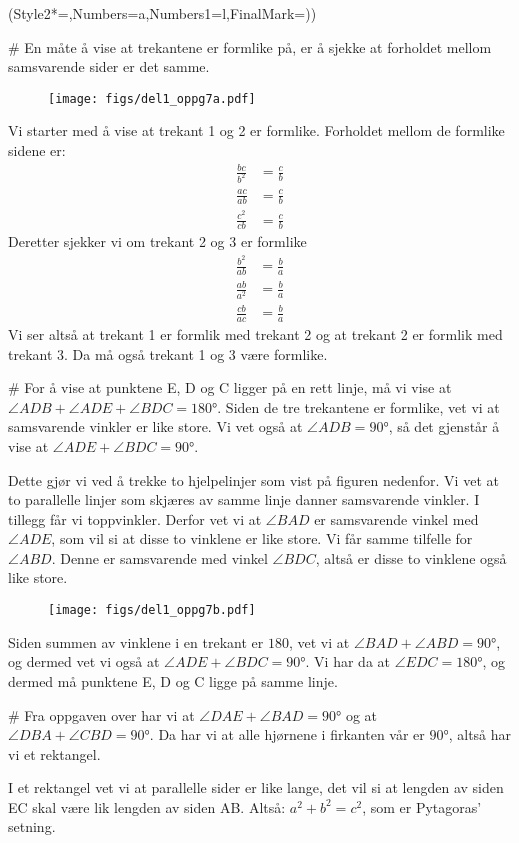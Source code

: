 \begin{easylist}[enumerate]
	\ListProperties(Style2*=,Numbers=a,Numbers1=l,FinalMark={)})
	
	# En måte å vise at trekantene er formlike på, er å sjekke at forholdet mellom samsvarende sider er det samme. 
	\begin{figure}[ht!]
		\centering
		\texttt{[image: figs/del1\_oppg7a.pdf]}
		\label{fig:del1_oppg7a}
	\end{figure}	
	Vi starter med å vise at trekant 1 og 2 er formlike. Forholdet mellom de formlike sidene er:
	\begin{align*}
			\frac{bc}{b^2} & = \frac{c}{b} \\
			\frac{ac}{ab} & = \frac{c}{b} \\
			\frac{c^2}{cb} & = \frac{c}{b}
	\end{align*}
	Deretter sjekker vi om trekant 2 og 3 er formlike
	\begin{align*}
			\frac{b^2}{ab} & = \frac{b}{a} \\
			\frac{ab}{a^2} & = \frac{b}{a} \\
			\frac{cb}{ac} & = \frac{b}{a}
	\end{align*}
	Vi ser altså at trekant 1 er formlik med trekant 2 og at trekant 2 er formlik med trekant 3. 
	Da må også trekant 1 og 3 være formlike. 
	
	# For å vise at punktene E, D og C ligger på en rett linje, må vi vise at $ \angle ADB + \angle ADE + \angle BDC = \ang{180} $. 
	Siden de tre trekantene er formlike, vet vi at samsvarende vinkler er like store. 
	Vi vet også at $\angle ADB = \ang{90}$, så det gjenstår å vise at $\angle ADE + \angle BDC = \ang{90}$.
	
	Dette gjør vi ved å trekke to hjelpelinjer som vist på figuren nedenfor. 
	Vi vet at to parallelle linjer som skjæres av samme linje danner samsvarende vinkler. 
	I tillegg får vi toppvinkler. Derfor vet vi at $\angle BAD$ er samsvarende vinkel med $\angle ADE$, som vil si at disse to vinklene er like store. 
	Vi får samme tilfelle for $\angle ABD$. 
	Denne er samsvarende med vinkel $\angle BDC$, altså er disse to vinklene også like store.
	\begin{figure}[ht!]
		\centering
		\texttt{[image: figs/del1\_oppg7b.pdf]}
		\label{fig:del1_oppg7b}
	\end{figure}
	Siden summen av vinklene i en trekant er $180$, vet vi at $\angle BAD + \angle  ABD = \ang{90}$, og dermed vet vi også at $\angle ADE + \angle BDC = \ang{90}$. 
	Vi har da at $\angle EDC  = \ang{180}$, og dermed må punktene E, D og C ligge på samme linje.
	
	# Fra oppgaven over har vi at $\angle DAE + \angle BAD = \ang{90}$ og at $\angle DBA + \angle CBD = \ang{90}$. 
	Da har vi at alle hjørnene i firkanten vår er $\ang{90}$, altså har vi et rektangel. 
	
	I et rektangel vet vi at parallelle sider er like lange, det vil si at lengden av siden EC skal være lik lengden av siden AB. 
	Altså: $a^2 + b^2 = c^2$, som er Pytagoras' setning.
	
\end{easylist}
\newpage



